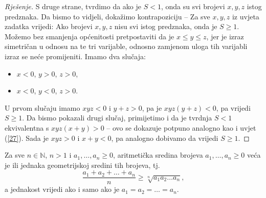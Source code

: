 \begin{proof}[Rješenje]
S druge strane, tvrdimo da ako je $S<1$, onda su svi brojevi $x, y, z$ istog predznaka. Da bismo to vidjeli, dokažimo kontrapoziciju -- Za sve $x, y, z$ iz uvjeta zadatka vrijedi: Ako brojevi $x, y, z$ nisu svi istog predznaka, onda je $S\geq 1$. Možemo bez smanjenja općenitosti pretpostaviti da je $x\leq y\leq z$, jer je izraz simetričan u odnosu na te tri varijable, odnosno zamjenom uloga tih varijabli izraz se neće promijeniti. Imamo dva slučaja:
\begin{itemize}
\item $x<0$, $y>0$, $z>0$,
\item $x<0$, $y<0$, $z>0$.
\end{itemize}
U prvom slučaju imamo $xyz<0$ i $y+z>0$, pa je $xyz(y+z)<0$, pa vrijedi $S\geq 1$. Da bismo pokazali drugi slučaj, primijetimo i da je tvrdnja $S<1$ ekvivalentna s $xyz(x+y)>0$ -- ovo se dokazuje potpuno analogno kao i uvjet (\ref{27}). Sada je $xyz>0$ i $x+y<0$, pa analogno dobivamo da vrijedi $S\geq 1$.
\end{proof}
\begin{remark}[A-G nejednakost]
\label{agrem}
Za sve $n\in \mathbb{N}$, $n>1$ i $a_1, \dots, a_n\geq 0$, aritmetička sredina brojeva $a_1, \dots, a_n\geq 0$ veća je ili jednaka geometrijskoj sredini tih brojeva, tj.
$$\dfrac{a_1+a_2+\dots+a_n}{n}\geq \sqrt[n]{a_1a_2\dots a_n},$$
a jednakost vrijedi ako i samo ako je $a_1=a_2=\dots=a_n$.
\end{remark}

